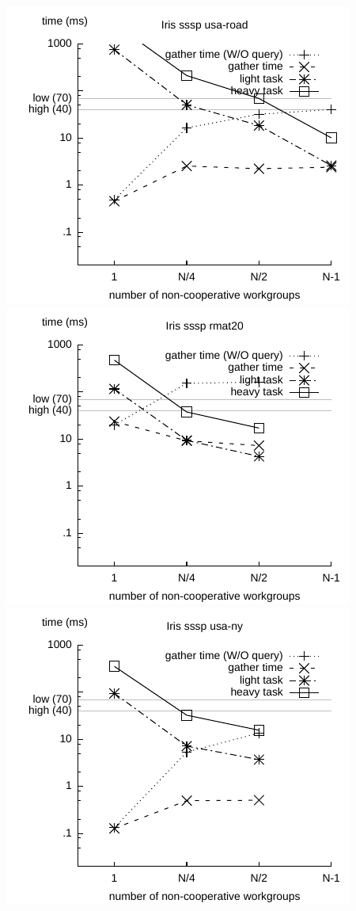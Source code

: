 \documentclass[sigconf]{acmart}
\begin{document}
{\includegraphics[width=.7\columnwidth]{images/barrier/iris_sssp_usa_road.pdf} \\
\includegraphics[width=.7\columnwidth]{images/barrier/iris_sssp_rmat20.pdf} \\
\includegraphics[width=.7\columnwidth]{images/barrier/iris_sssp_usa_ny.pdf} \\
}
\end{document}
